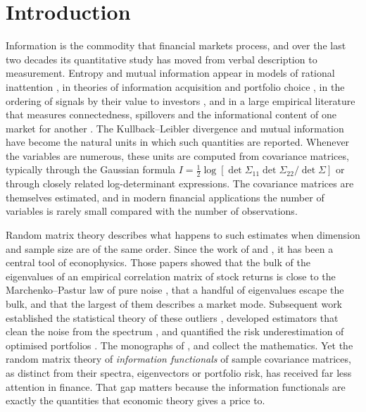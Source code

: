 \section*{Introduction}

Information is the commodity that financial markets process, and over the last two decades its quantitative study has moved from verbal description to measurement. Entropy and mutual information appear in models of rational inattention \citep{sims2003implications,matejka2015rational,mackowiak2023rational}, in theories of information acquisition and portfolio choice \citep{vannieuwerburgh2010information,veldkamp2011information,kacperczyk2016rational}, in the ordering of signals by their value to investors \citep{cabrales2013entropy,kadan2019estimating}, and in a large empirical literature that measures connectedness, spillovers and the informational content of one market for another \citep{billio2012econometric,diebold2014network}. The Kullback--Leibler divergence \citep{kullback1951information} and mutual information \citep{shannon1948mathematical,cover2006elements} have become the natural units in which such quantities are reported. Whenever the variables are numerous, these units are computed from covariance matrices, typically through the Gaussian formula $I=\tfrac12\log[\det\Sigma_{11}\det\Sigma_{22}/\det\Sigma]$ or through closely related log-determinant expressions. The covariance matrices are themselves estimated, and in modern financial applications the number of variables is rarely small compared with the number of observations.

Random matrix theory describes what happens to such estimates when dimension and sample size are of the same order. Since the work of \citet{laloux1999noise} and \citet{plerou1999universal}, it has been a central tool of econophysics. Those papers showed that the bulk of the eigenvalues of an empirical correlation matrix of stock returns is close to the Marchenko--Pastur law of pure noise \citep{marchenko1967distribution}, that a handful of eigenvalues escape the bulk, and that the largest of them describes a market mode. Subsequent work established the statistical theory of these outliers \citep{johnstone2001distribution,baik2005phase,paul2007asymptotics,benaych2011eigenvalues}, developed estimators that clean the noise from the spectrum \citep{ledoit2004well,ledoit2012nonlinear,bun2016rotational,bun2017cleaning,ledoit2020analytical}, and quantified the risk underestimation of optimised portfolios \citep{pafka2003noisy,elkaroui2010high,bodnar2018estimation}. The monographs of \citet{bai2010spectral}, \citet{anderson2010introduction} and \citet{potters2020first} collect the mathematics. Yet the random matrix theory of \emph{information functionals} of sample covariance matrices, as distinct from their spectra, eigenvectors or portfolio risk, has received far less attention in finance. That gap matters because the information functionals are exactly the quantities that economic theory gives a price to.

